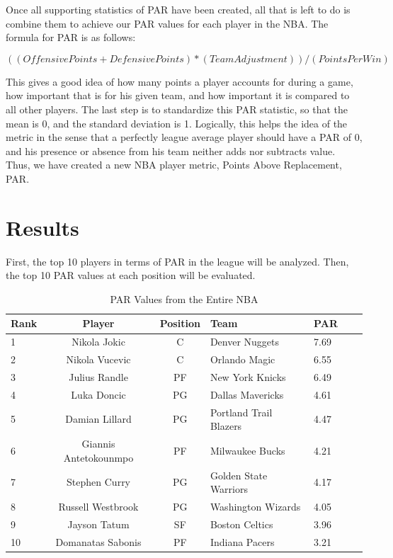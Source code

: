 \documentclass[12pt]{article}
\begin{document}
Once all supporting statistics of PAR have been created, all that is left to do is combine them to achieve our PAR values for each player in the NBA. The formula for PAR is as follows:

\begin{equation}
((Offensive Points + DefensivePoints) * (Team Adjustment))/(Points Per Win)
\end{equation}

This gives a good idea of how many points a player accounts for during a game, how important that is for 
his given team, and how important it is compared to all other players. The last step is to standardize this 
PAR statistic, so that the mean is 0, and the standard deviation is 1. Logically, this helps the idea of the 
metric in the sense that a perfectly league average player should have a PAR of 0, and his presence or 
absence from his team neither adds nor subtracts value. Thus, we have created a new NBA player metric, 
Points Above Replacement, PAR.
 
 
\section{Results}
First, the top 10 players in terms of PAR in the league will be analyzed. Then, the top 10 PAR values at each position will be evaluated.

\begin{table}[H]
  \caption{PAR Values from the Entire NBA}
  \label{tab:NBAtable}
\centering
\begin{tabular}[t]{lccllll}
  \toprule
  Rank & Player & Position & Team & PAR\\
  \midrule
 1 & Nikola Jokic & C & Denver Nuggets & 7.69\\
  \midrule
 2 & Nikola Vucevic & C & Orlando Magic & 6.55\\
  \midrule
 3 & Julius Randle & PF & New York Knicks & 6.49\\
  \midrule
 4 & Luka Doncic & PG & Dallas Mavericks & 4.61\\
  \midrule
 5 & Damian Lillard & PG & Portland Trail Blazers & 4.47\\
  \midrule
 6 & Giannis Antetokounmpo & PF & Milwaukee Bucks & 4.21\\
  \midrule
 7 & Stephen Curry & PG & Golden State Warriors & 4.17\\
  \midrule
 8 & Russell Westbrook & PG & Washington Wizards & 4.05\\
  \midrule
 9 & Jayson Tatum & SF & Boston Celtics & 3.96\\
  \midrule
 10 & Domanatas Sabonis & PF & Indiana Pacers & 3.21\\
  \bottomrule
\end{tabular}
\end{table}
\end{document}
